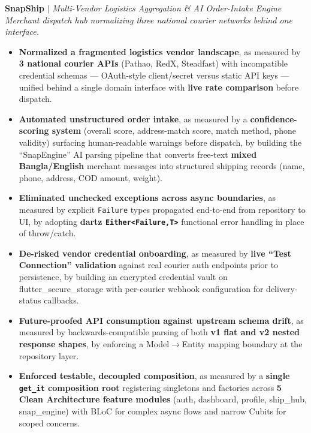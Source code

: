 \documentclass[10pt,letterpaper]{article}
\newenvironment{highlights}{
  \begin{itemize}[topsep=2pt,parsep=1pt,partopsep=0pt,itemsep=0pt,leftmargin=10pt]
}{\end{itemize}}
\begin{document}
\vspace{3pt}

\textbf{SnapShip} $|$ \textit{Multi-Vendor Logistics Aggregation \& AI Order-Intake Engine}
\hfill
\href{https://github.com/H-Yeasin/snapship}{\textcolor{myblue}{\faGithub}}\\
\textit{Merchant dispatch hub normalizing three national courier networks behind one interface.}
\begin{highlights}
  \item \textbf{Normalized a fragmented logistics vendor landscape}, as measured by \textbf{3 national courier APIs} (Pathao, RedX, Steadfast) with incompatible credential schemas — OAuth-style client/secret versus static API keys — unified behind a single domain interface with \textbf{live rate comparison} before dispatch.
  \item \textbf{Automated unstructured order intake}, as measured by a \textbf{confidence-scoring system} (overall score, address-match score, match method, phone validity) surfacing human-readable warnings before dispatch, by building the ``SnapEngine'' AI parsing pipeline that converts free-text \textbf{mixed Bangla/English} merchant messages into structured shipping records (name, phone, address, COD amount, weight).
  \item \textbf{Eliminated unchecked exceptions across async boundaries}, as measured by explicit \texttt{Failure} types propagated end-to-end from repository to UI, by adopting \textbf{dartz \texttt{Either<Failure,T>}} functional error handling in place of throw/catch.
  \item \textbf{De-risked vendor credential onboarding}, as measured by \textbf{live ``Test Connection'' validation} against real courier auth endpoints prior to persistence, by building an encrypted credential vault on flutter\_secure\_storage with per-courier webhook configuration for delivery-status callbacks.
  \item \textbf{Future-proofed API consumption against upstream schema drift}, as measured by backwards-compatible parsing of both \textbf{v1 flat and v2 nested response shapes}, by enforcing a Model$\to$Entity mapping boundary at the repository layer.
  \item \textbf{Enforced testable, decoupled composition}, as measured by a \textbf{single \texttt{get\_it} composition root} registering singletons and factories across \textbf{5 Clean Architecture feature modules} (auth, dashboard, profile, ship\_hub, snap\_engine) with BLoC for complex async flows and narrow Cubits for scoped concerns.

\end{highlights}
\end{document}
